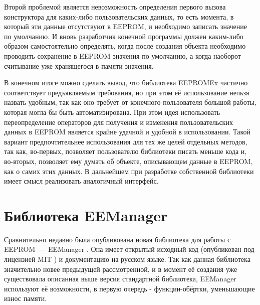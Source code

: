 Второй проблемой является невозможность определения первого вызова конструктора для каких-либо пользовательских данных, то есть момента, в который эти данные отсутствуют в EEPROM, и необходимо записать значение по умолчанию.
И вновь разработчик конечной программы должен каким-либо образом самостоятельно определять, когда после создания объекта необходимо проводить сохранение в EEPROM значения по умолчанию, а когда наоборот считывание уже хранящегося в памяти значения.

В конечном итоге можно сделать вывод, что библиотека EEPROMEx частично соответствует предъявляемым требования, но при этом её использование нельзя назвать удобным, так как оно требует от конечного пользователя большой работы, которая могла бы быть автоматизирована.
При этом идея использовать переопределение операторов для получения и изменения пользовательских данных в EEPROM является крайне удачной и удобной в использовании.
Такой вариант предпочтительнее использования для тех же целей отдельных методов, так как, во-первых, позволяет пользователю библиотеки писать меньше кода и, во-вторых, позволяет ему думать об объекте, описывающем данные в EEPROM, как о самих этих данных.
В дальнейшем при разработке собственной библиотеки имеет смысл реализовать аналогичный интерфейс.


\section{Библиотека EEManager} \label{section:eemanager}

Сравнительно недавно была опубликована новая библиотека для работы с EEPROM~--- EEManager \cite{web:eemanager}.
Она имеет открытый исходный код (опубликован под лицензией MIT \cite{web:MIT}) и документацию на русском языке.
Так как данная библиотека значительно новее предыдущей рассмотренной, и в момент её создания уже существовала описанная выше версия стандартной библиотека, EEManager используют её возможности, в первую очередь - функции-обёртки, уменьшающие износ памяти.

